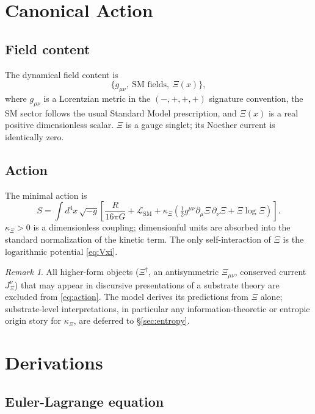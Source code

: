 \documentclass[11pt,reqno]{amsart}
\theoremstyle{plain}
\theoremstyle{definition}
\theoremstyle{remark}
\newtheorem*{remark}{Remark}
\newcommand{\SM}{\mathrm{SM}}
\begin{document}
\section{Canonical Action}\label{sec:action}

\subsection{Field content}

The dynamical field content is
\[
  \bigl\{ g_{\mu\nu},\ \text{SM fields},\ \Xi(x) \bigr\},
\]
where $g_{\mu\nu}$ is a Lorentzian metric in the $(-,+,+,+)$ signature
convention, the SM sector follows the usual Standard Model prescription, and
$\Xi(x)$ is a real positive dimensionless scalar. $\Xi$ is a gauge singlet;
its Noether current is identically zero.

\subsection{Action}

The minimal action is
\begin{equation}\label{eq:action}
  S=\int d^{4}x\,\sqrt{-g}\left[\frac{R}{16\pi G}
     +\mathcal{L}_{\SM}
     +\kappa_\Xi\!\left(\tfrac{1}{2}g^{\mu\nu}\partial_\mu\Xi\,\partial_\nu\Xi
     +\Xi\log\Xi\right)\right].
\end{equation}
$\kappa_\Xi>0$ is a dimensionless coupling; dimensionful units are absorbed
into the standard normalization of the kinetic term. The only self-interaction
of $\Xi$ is the logarithmic potential \eqref{eq:Vxi}.

\begin{remark}
All higher-form objects ($\Xi^{\dagger}$, an antisymmetric $\Xi_{\mu\nu}$,
conserved current $J^{\nu}_{\Xi}$) that may appear in discursive presentations
of a substrate theory are excluded from \eqref{eq:action}. The model derives
its predictions from $\Xi$ alone; substrate-level interpretations, in particular
any information-theoretic or entropic origin story for $\kappa_\Xi$, are
deferred to \S\ref{sec:entropy}.
\end{remark}

\section{Derivations}\label{sec:derivations}

\subsection{Euler-Lagrange equation}
\end{document}

